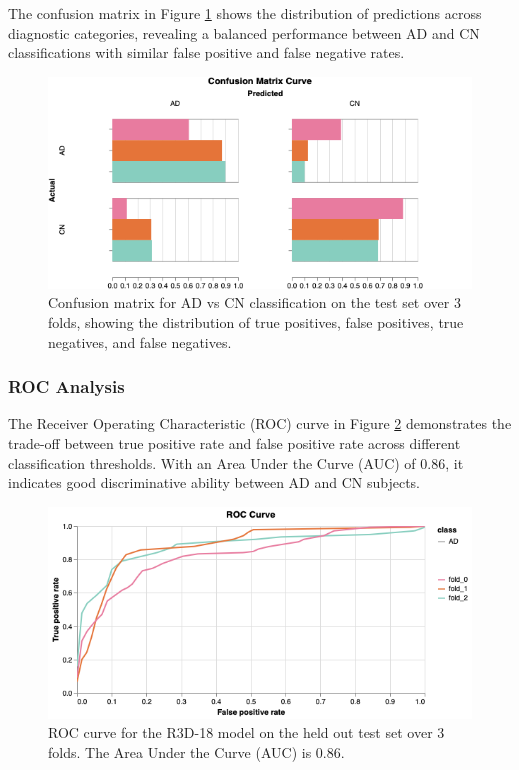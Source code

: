 \documentclass[11pt, a4paper]{article}
\begin{document}
The confusion matrix in Figure \ref{fig:confusion_matrix} shows the distribution of predictions across diagnostic categories, revealing a balanced performance between AD and CN classifications with similar false positive and false negative rates.

\begin{figure}[htbp]
  \centering
  \includegraphics[width=\textwidth]{figures/CM3F.png}
  \caption{Confusion matrix for AD vs CN classification on the test set over 3 folds, showing the distribution of true positives, false positives, true negatives, and false negatives.}
  \label{fig:confusion_matrix}
\end{figure}

\subsubsection{ROC Analysis}

The Receiver Operating Characteristic (ROC) curve in Figure \ref{fig:roc_curve} demonstrates the trade-off between true positive rate and false positive rate across different classification thresholds. With an Area Under the Curve (AUC) of 0.86, it indicates good discriminative ability between AD and CN subjects.

\begin{figure}[htbp]
  \centering
  \includegraphics[width=\textwidth]{figures/ROC3F.png}
  \caption{ROC curve for the R3D-18 model on the held out test set over 3 folds. The Area Under the Curve (AUC) is 0.86.}
  \label{fig:roc_curve}
\end{figure}
\end{document}
